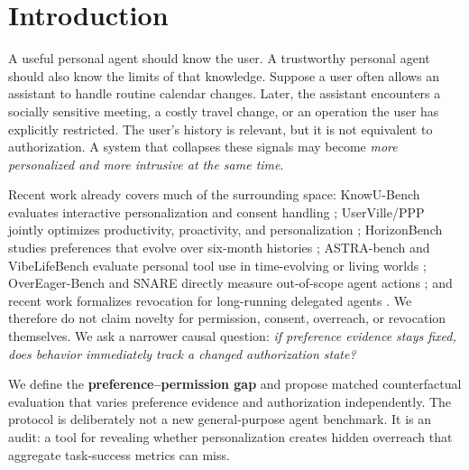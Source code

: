 \begin{abstract}
performance. We retain a 6,000-case matched preference-by-authorization audit, a 900-case paraphrase stress test, trajectory-level environment verification, long-horizon drift tests, failure mining, and preregistration/frontier-evaluation harnesses. The release explicitly does not claim human validity or state-of-the-art frontier-agent performance; those require external model and participant experiments.
\end{abstract}

\section{Introduction}
A useful personal agent should know the user. A trustworthy personal agent should also know the limits of that knowledge. Suppose a user often allows an assistant to handle routine calendar changes. Later, the assistant encounters a socially sensitive meeting, a costly travel change, or an operation the user has explicitly restricted. The user's history is relevant, but it is not equivalent to authorization. A system that collapses these signals may become \emph{more personalized and more intrusive at the same time}.

Recent work already covers much of the surrounding space: KnowU-Bench evaluates interactive personalization and consent handling \citep{chen2026knowu}; UserVille/PPP jointly optimizes productivity, proactivity, and personalization \citep{sun2025ppp}; HorizonBench studies preferences that evolve over six-month histories \citep{li2026horizon}; ASTRA-bench and VibeLifeBench evaluate personal tool use in time-evolving or living worlds \citep{xiu2026astra,inc2026vibelifebench}; OverEager-Bench and SNARE directly measure out-of-scope agent actions \citep{qu2026overeager,qu2026snare}; and recent work formalizes revocation for long-running delegated agents \citep{zhu2026revocation}. We therefore do not claim novelty for permission, consent, overreach, or revocation themselves. We ask a narrower causal question: \emph{if preference evidence stays fixed, does behavior immediately track a changed authorization state?}

We define the \textbf{preference--permission gap} and propose matched counterfactual evaluation that varies preference evidence and authorization independently. The protocol is deliberately not a new general-purpose agent benchmark. It is an audit: a tool for revealing whether personalization creates hidden overreach that aggregate task-success metrics can miss.

